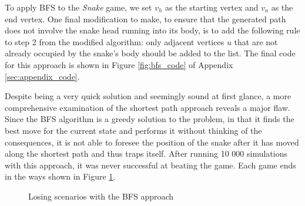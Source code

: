 \documentclass[12pt]{article}
\begin{document}
To apply BFS to the \textit{Snake} game, we set $v_{h}$ as the starting vertex and $v_{a}$ as the end vertex. One final modification to make, to ensure that the generated path does not involve the snake head running into its body, is to add the following rule to step 2 from the modified algorithm: only adjacent vertices $u$ that are not already occupied by the snake's body should be added to the list. The final code for this approach is shown in Figure \ref{fig:bfs_code} of Appendix \ref{sec:appendix_code}.

Despite being a very quick solution and seemingly sound at first glance, a more comprehensive examination of the shortest path approach reveals a major flaw. Since the BFS algorithm is a greedy solution to the problem, in that it finds the best move for the current state and performs it without thinking of the consequences, it is not able to foresee the position of the snake after it has moved along the shortest path and thus traps itself. After running 10 000 simulations with this approach, it was never successful at beating the game. Each game ends in the ways shown in Figure \ref{fig:bfs_issues}.

\begin{figure}[!h]
\centering
	\hspace{1.15em}
	\caption{Losing scenarios with the BFS approach}
	\label{fig:bfs_issues}
\end{figure}
\end{document}

